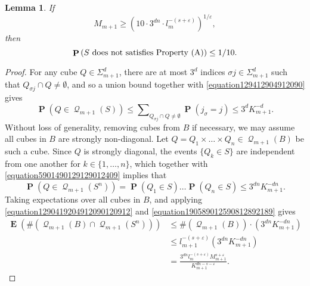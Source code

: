 \documentclass[12pt,reqno]{article}
\numberwithin{equation}{section}
\newtheorem{lemma}[theorem]{Lemma}
\DeclareMathOperator{\EE}{\mathbf{E}}
\DeclareMathOperator{\PP}{\mathbf{P}}
\DeclareMathOperator{\DQ}{\mathcal{Q}}
\begin{document}
\begin{lemma} \label{propertyALemma}
    If
    \begin{equation} \label{equation194012904129009}
        M_{m+1} \geq \left( 10 \cdot 3^{dn} \cdot l_m^{-(s + \varepsilon)} \right)^{1/\varepsilon},
    \end{equation}
    then
    \[ \PP \left(S\ \text{\normalfont{does not satisfies Property (A)}} \right) \leq 1/10. \]
\end{lemma}
\begin{proof}
    For any cube $Q \in \Sigma_{m+1}^d$, there are at most $3^d$ indices $\sigma j \in \Sigma_{m+1}^d$ such that $Q_{\sigma j} \cap Q \neq \emptyset$, and so a union bound together with \eqref{equation129412904912090} gives
    \begin{equation} \label{equation5901490129129012409}
        \PP(Q \in \DQ_{m+1}(S)) \leq \sum\nolimits_{Q_{\sigma j} \cap Q \neq \emptyset} \PP(j_\sigma = j) \leq 3^d K_{m+1}^{-d}.
    \end{equation}
    Without loss of generality, removing cubes from $B$ if necessary, we may assume all cubes in $B$ are strongly non-diagonal. Let $Q = Q_1 \times \dots \times Q_n \in \DQ_{m+1}(B)$ be such a cube. Since $Q$ is strongly diagonal, the events $\{ Q_k \in S \}$ are independent from one another for $k \in \{ 1, \dots, n \}$, which together with \eqref{equation5901490129129012409} implies that
    \begin{equation} \label{equation190589012590812892189}
       \PP(Q \in \DQ_{m+1}(S^n)) = \PP(Q_1 \in S) \dots \PP(Q_n \in S) \leq 3^{dn} K_{m+1}^{-dn}.
    \end{equation}
    Taking expectations over all cubes in $B$, and applying \eqref{equation1290419204912090120912} and \eqref{equation190589012590812892189} gives
    \begin{equation} \label{equation129041289589128921891289}
    \begin{split}
        \EE(\#(\DQ_{m+1}(B) \cap \DQ_{m+1}(S^n))) &\leq \#(\DQ_{m+1}(B)) \cdot (3^{dn} K_{m+1}^{-dn})\\
        &\leq l_{m+1}^{-(s + \varepsilon)} (3^{dn} K_{m+1}^{- dn})\\
        &= \frac{3^{dn} l_m^{-(s + \varepsilon)} M_{m+1}^{s + \varepsilon}}{K_{m+1}^{dn - s - \varepsilon}}.
    \end{split}
    \end{equation}

\end{proof}
\end{document}
